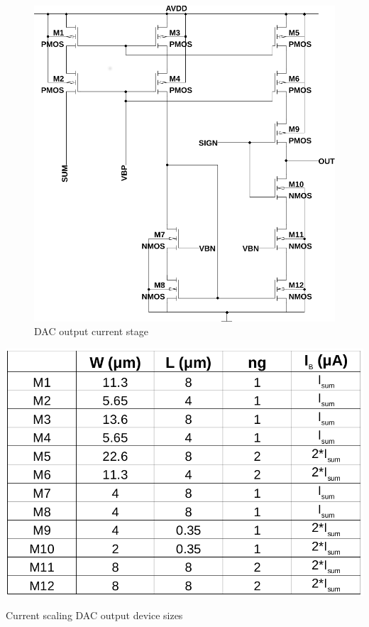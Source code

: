 \documentclass[12pt,oneside,final]{siuethesis}
\theoremstyle{definition}
\begin{document}
\begin{figure}[htbp!]
\centering
\includegraphics[scale=.6,keepaspectratio=true]{../LTspice_Drawings/dac/dac_out.png} 
\caption{DAC output current stage}
\label{fig:dac-out}
\end{figure}

\begin{table}[htbp!]
 \centering
 \includegraphics[scale=.35,keepaspectratio=true]{./ch3_figures/dac_out_sizes.png}
 \caption{Current scaling DAC output device sizes}
 \label{tab:dac-out-sizes}
\end{table}
\end{document}
